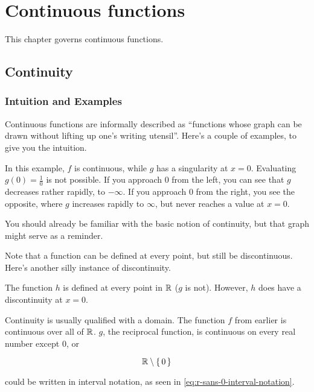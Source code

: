 \chapter{Continuous functions}

This chapter governs continuous functions.

\section{Continuity}

\subsection{Intuition and Examples}

Continuous functions are informally described as ``functions whose graph can be
drawn without lifting up one's writing utensil''. Here's a couple of examples,
to give you the intuition.


In this example, $f$ is continuous, while $g$ has a singularity at $x =
0$. Evaluating $g(0) = \frac{1}{0}$ is not possible. If you approach $0$ from
the left, you can see that $g$ decreases rather rapidly, to $-\infty$. If you
approach $0$ from the right, you see the opposite, where $g$ increases rapidly
to $\infty$, but never reaches a value at $x = 0$.

You should already be familiar with the basic notion of continuity, but that
graph might serve as a reminder.

Note that a function can be defined at every point, but still be
discontinuous. Here's another silly instance of discontinuity.


The function $h$ is defined at every point in $\mathbb{R}$ ($g$ is not). However, $h$
does have a discontinuity at $x = 0$.

Continuity is usually qualified with a domain. The function $f$ from earlier is
continuous over all of $\mathbb{R}$. $g$, the reciprocal function, is continuous on
every real number except $0$, or

\begin{equation}
    \label{eq:r-minus-0}
    \mathbb{R} \setminus \left\{\, 0 \,\right\}
\end{equation}

 could be written in interval notation, as seen in
\cref{eq:r-sans-0-interval-notation}.

